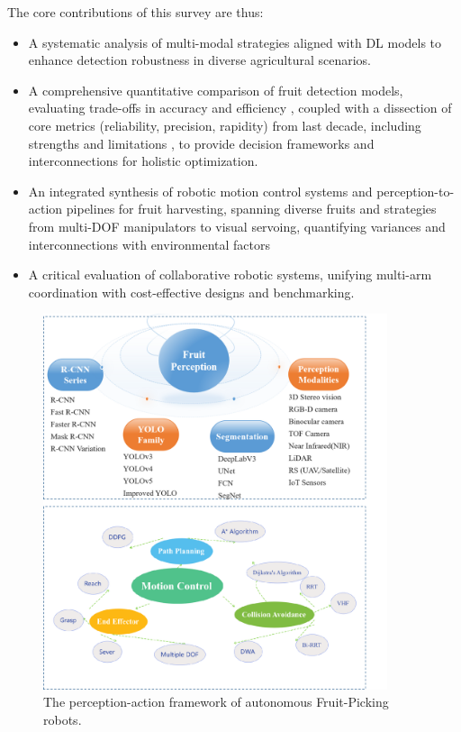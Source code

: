 \documentclass[pdflatex,sn-mathphys-num]{sn-jnl}
\begin{document}
The core contributions of this survey are thus:
\begin{itemize}
\item A systematic analysis of multi-modal strategies aligned with DL models to enhance detection robustness in diverse agricultural scenarios.

\item A comprehensive quantitative comparison of fruit detection models, evaluating trade-offs in accuracy 
 and efficiency 
, coupled with a dissection of core metrics (reliability, precision, rapidity) from last decade, including strengths 
and limitations 
, to provide decision frameworks and interconnections for holistic optimization.

\item An integrated synthesis of robotic motion control systems and perception-to-action pipelines for fruit harvesting, spanning diverse fruits and strategies from multi-DOF manipulators to visual servoing, quantifying variances 
and interconnections with environmental factors

\item A critical evaluation of collaborative robotic systems, unifying multi-arm coordination with cost-effective designs and benchmarking.
\end{itemize}

\begin{figure}[h!]
    \centering
    \includegraphics[width=0.9\textwidth]{fig_struct2.png}
    \caption{The perception-action framework of autonomous Fruit-Picking robots.}
    \label{fig:struct}
\end{figure}
\end{document}
